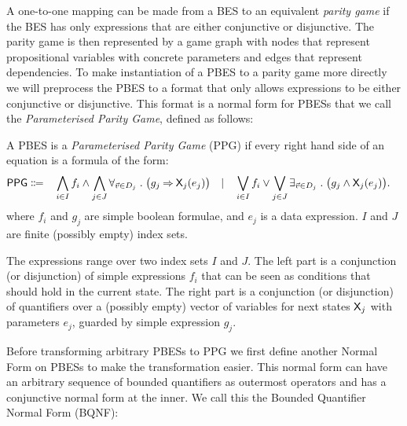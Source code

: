 \documentclass{article}
\begin{document}
A one-to-one mapping can be made from a BES to an equivalent \emph{parity game} if the BES has only expressions that are either conjunctive or disjunctive. The parity game is then represented by a game graph with nodes that represent propositional variables with concrete parameters and edges that represent dependencies.
To make instantiation of a PBES to a parity game more directly 
we will preprocess the PBES to a format that only allows expressions to be either conjunctive or disjunctive. 
This format is a normal form for PBESs that we call
the \emph{Parameterised Parity Game}, defined as follows:

\begin{definition}
A PBES is a \emph{Parameterised Parity Game} (PPG) if every right hand side of an equation is a formula of the form:
\begin{align*} 
\mathsf{PPG} \Coloneqq &\quad
          \bigwedge_{i \in I} f_i \land
          \bigwedge_{j \in J} \forall_{\vec{v} \in D_j} \mathrel{.} \big( g_j \mathbin{\Rightarrow} \mathsf{X}_j(e_j) \big) \quad
\vert \quad
          \bigvee_{i \in I} f_i \lor
          \bigvee_{j \in J} \exists_{\vec{v} \in D_j} \mathrel{.} \big( g_j \land \mathsf{X}_j(e_j) \big). 
\end{align*}
where $f_i$ and $g_j$ are simple boolean formulae, and $e_j$ is a data expression. $I$ and $J$ are finite (possibly empty) index sets.
\end{definition}

The expressions range over two index sets $I$ and $J$. The left part is a conjunction (or disjunction) of simple expressions $f_i$ that can be seen as conditions that should hold in the current state. The right part is a conjunction (or disjunction) of quantifiers over a (possibly empty) vector of variables for next states $\mathsf{X}_j$ with parameters $e_j$, guarded by simple expression $g_j$.

Before transforming arbitrary PBESs to PPG we first define another Normal Form on PBESs to make the transformation easier.
This normal form can have an arbitrary sequence of bounded quantifiers as outermost operators and has
a conjunctive normal form at the inner.
We call this the Bounded Quantifier Normal Form (BQNF):
\end{document}
